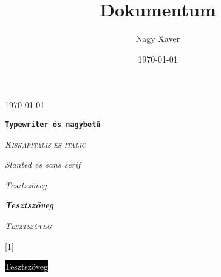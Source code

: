 \documentclass{article}
\title{Dokumentum}
\author{Nagy Xaver}
\date{\today}
\begin{document}
\today

\texttt{\textbf{Typewriter és nagybetű}}

\textit{\textsc{Kiskapitalis es italic}}

\textsl{\textsf{Slanted és sans serif}}

\textit{\emph{Tesztszöveg}}

\textbf{\emph{Tesztszöveg}}

\textsc{\emph{Tesztszöveg}}

\scalebox{-1}[1]{}


\colorbox{black}{\textcolor{white}{Tesztszöveg}}


\foreignlanguage{english}{\colorbox{black}{\textcolor{white}{\blindtext}}}

\begin{flushright}
\foreignlanguage{magyar}{\hulipsum[1]}
\end{flushright}

\linespread{1.6}
\foreignlanguage{latin}{\lipsum[1]}
\linespread{1}
\end{document}
